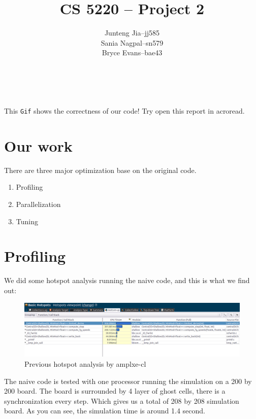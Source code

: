 \documentclass[11pt]{article}
\title{CS 5220 -- Project 2} %
\author{
  \begin{tabular}{l c l}
    Junteng Jia  & -- & jj585 \\
    Sania Nagpal & -- & sn579 \\
    Bryce Evans  & -- & bae43 \\
  \end{tabular}\\
  \rule{\linewidth}{0.4pt}
}
\date{}
\begin{document}
    \thispagestyle{empty}
    \maketitle
    \begin{center}
    \end{center}
    \begin{center}
    This \texttt{Gif} shows the correctness of our code! Try open this report in acroread.
    \end{center}

    \clearpage
    
    \section{Our work}
        There are three major optimization base on the original code.
        \begin{enumerate}
            \item Profiling
            \item Parallelization
            \item Tuning
        \end{enumerate}
    
        \vspace{0.3cm}
                

        \section{Profiling}
        We did some hotspot analysis running the naive code, and this is what we find out:
        \begin{figure}[H]
            \centering
            \includegraphics[width=4.5in]{hotspot_previous.png}
            \caption{Previous hotspot analysis by amplxe-cl}
        \end{figure}
        
        The naive code is tested with one processor running the simulation on a 200 by 200 board.
        The board is surrounded by 4 layer of ghost cells, there is a synchronization every step.
        Which gives us a total of 208 by 208 simulation board. As you can see, the simulation time
        is around 1.4 second. \\
        
\end{document}
